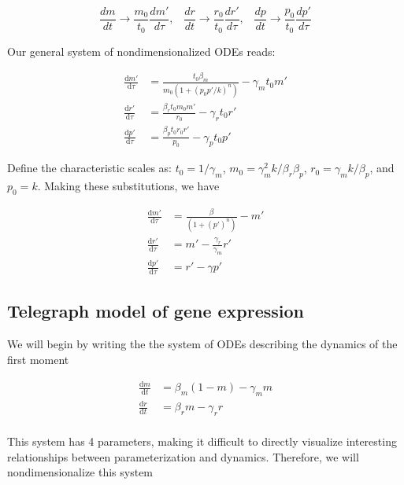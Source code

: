 \documentclass{ucetd}
\begin{document}
\begin{equation*}
\frac{dm}{dt} \rightarrow \frac{m_{0}}{t_{0}}\frac{dm'}{d\tau}, \;\;\; \frac{dr}{dt} \rightarrow \frac{r_{0}}{t_{0}}\frac{dr'}{d\tau},  \;\;\; \frac{dp}{dt} \rightarrow \frac{p_{0}}{t_{0}}\frac{dp'}{d\tau} 
\end{equation*}

Our general system of nondimensionalized ODEs reads:


\begin{align*}
\frac{\mathrm{d}m'}{\mathrm{d}\tau} &= \frac{t_0\beta_{m}}{m_0(1 + (p_{0}p'/k)^n)} - \gamma_m t_{0}m'\\
\frac{\mathrm{d}r'}{\mathrm{d}\tau} &= \frac{\beta_{r} t_{0}m_{0} m'}{r_0} - \gamma_r t_{0}r'\\
\frac{\mathrm{d}p'}{\mathrm{d}\tau} &= \frac{\beta_{p} t_{0}r_{0} r'}{p_{0}} - \gamma_{p} t_{0} p'
\end{align*}

Define the characteristic scales as: $t_{0} = 1/\gamma_{m}$, $m_{0}=\gamma_{m}^{2}k/\beta_{r}\beta_{p}$, $r_{0} = \gamma_{m}k/\beta_{p}$, and $p_{0} = k$. Making these substitutions, we have

\begin{align*}
\frac{\mathrm{d}m'}{\mathrm{d}\tau} &= \frac{\beta}{(1 + (p')^n)} - m'\\
\frac{\mathrm{d}r'}{\mathrm{d}\tau} &= m' - \frac{\gamma_{r}}{\gamma_{m}}r'\\
\frac{\mathrm{d}p'}{\mathrm{d}\tau} &= r' - \gamma p'
\end{align*}

\subsection{Telegraph model of gene expression}

We will begin by writing the the system of ODEs describing the dynamics of the first moment

\begin{align}
\frac{\mathrm{d}m}{\mathrm{d}t} &= \beta_{m}(1-m) - \gamma_m m\\
\frac{\mathrm{d}r}{\mathrm{d}t} &= \beta_{r} m - \gamma_r r\\
\end{align}

This system has 4 parameters, making it difficult to directly visualize interesting relationships between parameterization and dynamics. Therefore, we will nondimensionalize this system
\end{document}
